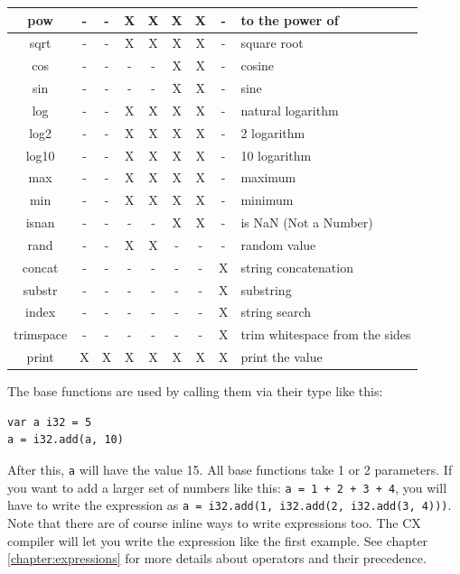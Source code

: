 \documentclass[11pt,fleqn,openany]{book} %
\begin{document}
\begin{center}
\begin{tabular}{|c|c|c|c|c|c|c|c| m{8cm} |}
        pow       & - & - & X & X & X & X & - & to the power of \\
        \hline
        sqrt      & - & - & X & X & X & X & - & square root \\
        cos       & - & - & - & - & X & X & - & cosine \\
        sin       & - & - & - & - & X & X & - & sine \\
        log       & - & - & X & X & X & X & - & natural logarithm \\
        log2      & - & - & X & X & X & X & - & 2 logarithm \\
        log10     & - & - & X & X & X & X & - & 10 logarithm \\
        max       & - & - & X & X & X & X & - & maximum \\
        min       & - & - & X & X & X & X & - & minimum \\
        isnan     & - & - & - & - & X & X & - & is NaN (Not a Number) \\
        rand      & - & - & X & X & - & - & - & random value \\
        \hline
        concat    & - & - & - & - & - & - & X & string concatenation\\
        substr    & - & - & - & - & - & - & X & substring \\
        index     & - & - & - & - & - & - & X & string search \\
        trimspace & - & - & - & - & - & - & X & trim whitespace from the sides \\
        \hline
        print     & X & X & X & X & X & X & X & print the value\\
        \hline 
    \end{tabular}
\end{center}

The base functions are used by calling them via their type like this: 

\begin{lstlisting}
var a i32 = 5
a = i32.add(a, 10)
\end{lstlisting}

After this, \texttt{a} will have the value 15.  All base functions take 1 or 2 parameters.  If you want to add a larger set of numbers like this: \texttt{a = 1 + 2 + 3 + 4}, you will have to write the expression as \texttt{a = i32.add(1, i32.add(2, i32.add(3, 4)))}.  Note that there are of course inline ways to write expressions too. The CX compiler will let you write the expression like the first example.  See chapter \ref{chapter:expressions} for more details about operators and their precedence.
\end{document}
